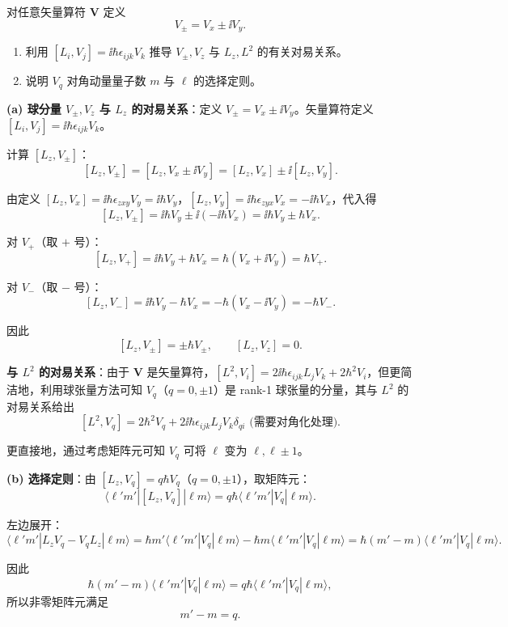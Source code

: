 \begin{question}
对任意矢量算符 $\mathbf V$ 定义
\[
V_\pm=V_x\pm\ii V_y.
\]
\begin{enumerate}
\item 利用 $[L_i,V_j]=\ii\hbar\epsilon_{ijk}V_k$ 推导 $V_\pm,V_z$ 与 $L_z,L^2$ 的有关对易关系。
\item 说明 $V_q$ 对角动量量子数 $m$ 与 $\ell$ 的选择定则。
\end{enumerate}
\end{question}
\begin{solution}
	\textbf{(a) 球分量 $V_\pm,V_z$ 与 $L_z$ 的对易关系}：定义 $V_\pm = V_x \pm \ii V_y$。矢量算符定义 $[L_i,V_j]=\ii\hbar\epsilon_{ijk}V_k$。

	计算 $[L_z,V_\pm]$：
	\[
	[L_z,V_\pm] = [L_z,V_x\pm\ii V_y] = [L_z,V_x]\pm\ii[L_z,V_y].
	\]

	由定义 $[L_z,V_x]=\ii\hbar\epsilon_{zxy}V_y = \ii\hbar V_y$，$[L_z,V_y]=\ii\hbar\epsilon_{zyx}V_x = -\ii\hbar V_x$，代入得
	\[
	[L_z,V_\pm] = \ii\hbar V_y \pm \ii(-\ii\hbar V_x) = \ii\hbar V_y \pm \hbar V_x.
	\]

	对 $V_+$（取 $+$ 号）：
	\[
	[L_z,V_+] = \ii\hbar V_y + \hbar V_x = \hbar(V_x+\ii V_y) = \hbar V_+.
	\]

	对 $V_-$（取 $-$ 号）：
	\[
	[L_z,V_-] = \ii\hbar V_y - \hbar V_x = -\hbar(V_x-\ii V_y) = -\hbar V_-.
	\]

	因此
	\[
	[L_z,V_\pm] = \pm\hbar V_\pm,\qquad [L_z,V_z]=0.
	\]

	\textbf{与 $L^2$ 的对易关系}：由于 $\mathbf V$ 是矢量算符，$[L^2,V_i]=2\ii\hbar\epsilon_{ijk}L_jV_k + 2\hbar^2 V_i$，但更简洁地，利用球张量方法可知 $V_q$（$q=0,\pm1$）是 rank-1 球张量的分量，其与 $L^2$ 的对易关系给出
	\[
	[L^2,V_q] = 2\hbar^2 V_q + 2\ii\hbar\epsilon_{ijk}L_jV_k\delta_{qi} \text{ (需要对角化处理)}.
	\]

	更直接地，通过考虑矩阵元可知 $V_q$ 可将 $\ell$ 变为 $\ell,\ell\pm1$。

	\textbf{(b) 选择定则}：由 $[L_z,V_q]=q\hbar V_q$（$q=0,\pm1$），取矩阵元：
	\[
	\langle \ell'm'|[L_z,V_q]|\ell m\rangle = q\hbar\langle \ell'm'|V_q|\ell m\rangle.
	\]

	左边展开：
	\[
	\langle \ell'm'|L_zV_q - V_qL_z|\ell m\rangle
	= \hbar m'\langle \ell'm'|V_q|\ell m\rangle - \hbar m\langle \ell'm'|V_q|\ell m\rangle
	= \hbar(m'-m)\langle \ell'm'|V_q|\ell m\rangle.
	\]

	因此
	\[
	\hbar(m'-m)\langle \ell'm'|V_q|\ell m\rangle = q\hbar\langle \ell'm'|V_q|\ell m\rangle,
	\]
	所以非零矩阵元满足
	\[
	m' - m = q.
	\]


\end{solution}

